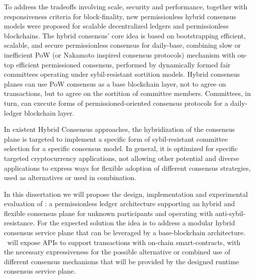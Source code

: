 
%

To address the tradeoffs involving scale, security and performance, together with responsiveness criteria for block-finality, new permissionless hybrid consensus models were proposed for scalable decentralized ledgers and permissionless blockchains. The hybrid consensus' core idea is based on bootstrapping efficient, scalable, and secure permissionless consensus for daily-base, combining slow or inefficient PoW (or Nakamoto inspired consensus protocols) mechanism with on-top efficient permissioned consensus, performed by dynamically formed fair committees operating under sybil-resistant sortition models. Hybrid consensus planes can use PoW consensus as a base blockchain layer, not to agree on transactions, but to agree on the sortition of committee members. Committees, in turn, can execute forms of permissioned-oriented consensus protocols for a daily-ledger blockchain layer.

In existent Hybrid Consensus approaches, the hybridization of the consensus plane is targeted to implement a specific form of sybil-resistant committee selection for a specific consensus model. In general, it is optimized for specific targeted cryptocurrency applications, not allowing other potential and diverse applications to express ways for flexible adoption of different consensus strategies, used as alternatives or used in combination.

In this dissertation we will propose the design, implementation and experimental evaluation of \mysystem: a permissionless ledger architecture supporting an hybrid and flexible consensus plane for unknown participants and operating with anti-sybil-resistance. For the expected solution the idea is to address a modular hybrid consensus service plane that can be leveraged by a base-blockchain architecture. \mysystem~will expose APIs to support transactions with on-chain smart-contracts, with the necessary expressiveness for the possible alternative or combined use of different consensus mechanisms that will be provided by the designed runtime consensus service plane.

